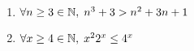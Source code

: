 \begin{enumerate}
\wbvfill


\item $\forall n \geq 3 \in {\mathbb N}, \; n^{3}+3>n^{2}+3n+1$

\wbvfill

\workbookpagebreak

\item $\forall x \geq 4 \in {\mathbb N}, \; x^22^x \leq 4^x$

\wbvfill


\end{enumerate}




